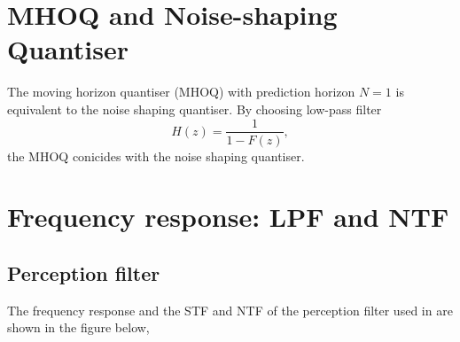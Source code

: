 \documentclass[a4paper]{article}
\begin{document}
\section{MHOQ and Noise-shaping Quantiser}
The moving horizon quantiser (MHOQ) with prediction horizon $N = 1$ is equivalent to the noise shaping quantiser.  By choosing low-pass filter $$H(z)  = \frac{1 }{ 1- F(z)},$$  the MHOQ conicides with the noise shaping quantiser.


\section{Frequency response: LPF and NTF}
\subsection{Perception filter}
The  frequency response and the STF and NTF of the perception filter used in  
\cite{goodwin2003moving} are shown in the
figure below, 
\end{document}
